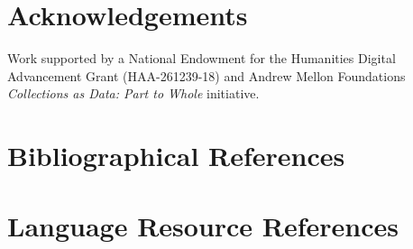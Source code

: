 \documentclass[10pt, a4paper]{article}
\begin{document}
\section{Acknowledgements}

Work supported by a National Endowment for the Humanities Digital Advancement
Grant (HAA-261239-18) and Andrew Mellon Foundations \textit{Collections as Data:
Part to Whole} initiative.

\nocite{*}
\section{Bibliographical References}\label{reference}




\section{Language Resource References}
\label{lr:ref}
\end{document}
